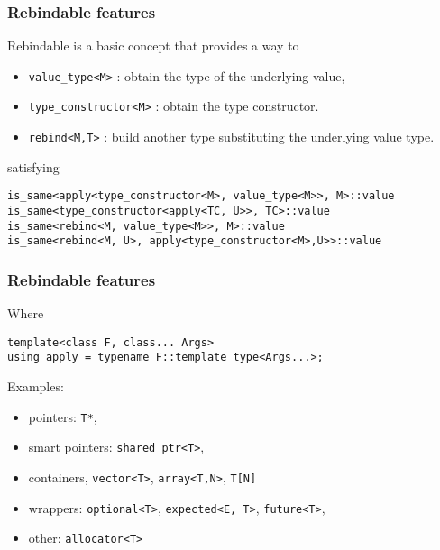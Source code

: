 \documentclass[xcolor=dvipsnames]{beamer}
\newcommand{\cpp}[1]{\lstinline{#1}}
\begin{document}
\begin{frame}[fragile]
\frametitle{Rebindable features}

Rebindable is a basic concept that provides a way to

\begin{itemize}
  \item \cpp{value_type<M>} : obtain the type of the underlying value, 
  \item \cpp{type_constructor<M>} : obtain the type constructor. 
  \item \cpp{rebind<M,T>} : build another type substituting the underlying value type. 
\end{itemize}

satisfying 

\begin{lstlisting}
is_same<apply<type_constructor<M>, value_type<M>>, M>::value
is_same<type_constructor<apply<TC, U>>, TC>::value
is_same<rebind<M, value_type<M>>, M>::value
is_same<rebind<M, U>, apply<type_constructor<M>,U>>::value
\end{lstlisting}

\end{frame}
\begin{frame}[fragile]
\frametitle{Rebindable features}

Where

\begin{lstlisting}
template<class F, class... Args>
using apply = typename F::template type<Args...>;
\end{lstlisting}

Examples:
\begin{itemize}
  \item pointers:  \cpp{T*}, 
  \item smart pointers: \cpp{shared_ptr<T>}, 
  \item containers, \cpp{vector<T>},  \cpp{array<T,N>},  \cpp{T[N]} 
  \item wrappers: \cpp{optional<T>}, \cpp{expected<E, T>}, \cpp{future<T>},
  \item other: \cpp{allocator<T>}   
\end{itemize}

\end{frame}
\end{document}
